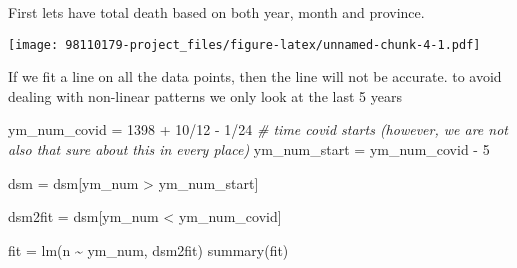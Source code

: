 \documentclass[
]{article}
\newenvironment{Shaded}{\begin{snugshade}}{\end{snugshade}}
\newcommand{\AttributeTok}[1]{\textcolor[rgb]{0.77,0.63,0.00}{#1}}
\newcommand{\CommentTok}[1]{\textcolor[rgb]{0.56,0.35,0.01}{\textit{#1}}}
\newcommand{\DecValTok}[1]{\textcolor[rgb]{0.00,0.00,0.81}{#1}}
\newcommand{\FunctionTok}[1]{\textcolor[rgb]{0.00,0.00,0.00}{#1}}
\newcommand{\NormalTok}[1]{#1}
\newcommand{\OtherTok}[1]{\textcolor[rgb]{0.56,0.35,0.01}{#1}}
\newcommand{\SpecialCharTok}[1]{\textcolor[rgb]{0.00,0.00,0.00}{#1}}
\newcommand{\StringTok}[1]{\textcolor[rgb]{0.31,0.60,0.02}{#1}}
\begin{document}
First lets have total death based on both year, month and province.

\begin{Shaded}
\end{Shaded}

\texttt{[image: 98110179-project\_files/figure-latex/unnamed-chunk-4-1.pdf]}

If we fit a line on all the data points, then the line will not be
accurate. to avoid dealing with non-linear patterns we only look at the
last 5 years

\begin{Shaded}
\begin{Highlighting}[]
\NormalTok{ym\_num\_covid }\OtherTok{=} \DecValTok{1398} \SpecialCharTok{+} \DecValTok{10}\SpecialCharTok{/}\DecValTok{12} \SpecialCharTok{{-}} \DecValTok{1}\SpecialCharTok{/}\DecValTok{24} \CommentTok{\# time covid starts (however, we are not also that sure about this in every place)}
\NormalTok{ym\_num\_start }\OtherTok{=}\NormalTok{ ym\_num\_covid }\SpecialCharTok{{-}} \DecValTok{5}

\NormalTok{dsm }\OtherTok{=}\NormalTok{ dsm[ym\_num }\SpecialCharTok{\textgreater{}}\NormalTok{ ym\_num\_start]}

\NormalTok{dsm2fit }\OtherTok{=}\NormalTok{ dsm[ym\_num }\SpecialCharTok{\textless{}}\NormalTok{ ym\_num\_covid]}

\NormalTok{fit }\OtherTok{=} \FunctionTok{lm}\NormalTok{(n }\SpecialCharTok{\textasciitilde{}}\NormalTok{ ym\_num, dsm2fit)}
\FunctionTok{summary}\NormalTok{(fit)}
\end{Highlighting}
\end{Shaded}
\end{document}

